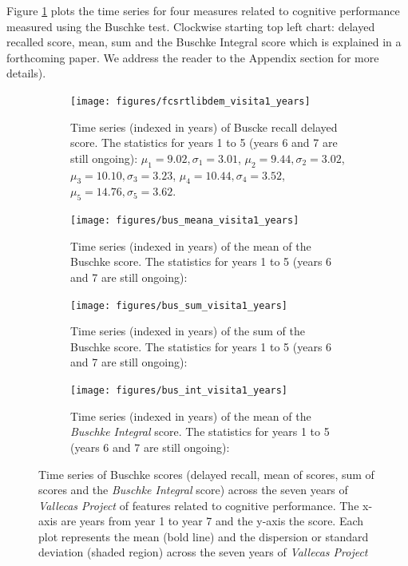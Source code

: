\documentclass[11pt]{article}
\theoremstyle{definition}
\theoremstyle{remark}
\begin{document}
Figure \ref{fig:busper4} plots the time series for four measures related to cognitive performance measured using the Buschke test. Clockwise starting top left chart: delayed recalled score, mean, sum and the Buschke Integral score which is explained in a forthcoming paper. We address the reader to the Appendix section for more details).

\begin{figure}[!htb]
    \centering
    \begin{subfigure}[t]{0.45\textwidth}
        \centering
        \texttt{[image: figures/fcsrtlibdem\_visita1\_years]}
        \caption{Time series (indexed in years) of Buscke recall delayed score. The statistics for years 1 to 5 (years 6 and 7 are still ongoing): $\mu_{1}=9.02, \sigma_{1}=3.01$, $\mu_{2}=9.44, \sigma_{2}=3.02$, $\mu_{3}=10.10, \sigma_{3}=3.23$, $\mu_{4}=10.44, \sigma_{4}=3.52$,$\mu_{5}=14.76,\sigma_{5}=3.62$.}
    \end{subfigure}
    \hfill
    \begin{subfigure}[t]{0.45\textwidth}
        \centering
        \texttt{[image: figures/bus\_meana\_visita1\_years]}
        \caption{Time series (indexed in years) of the mean of the Buschke score. The statistics for years 1 to 5 (years 6 and 7 are still ongoing): }
    \end{subfigure}%
    
     \begin{subfigure}[t]{0.45\textwidth}
        \centering
        \texttt{[image: figures/bus\_sum\_visita1\_years]}
        \caption{Time series (indexed in years) of the sum of the Buschke score. The statistics for years 1 to 5 (years 6 and 7 are still ongoing):}
    \end{subfigure}
    \hfill 
    \begin{subfigure}[t]{0.45\textwidth}
        \centering
        \texttt{[image: figures/bus\_int\_visita1\_years]}
        \caption{Time series (indexed in years) of the mean of the \emph{Buschke Integral} score. The statistics for years 1 to 5 (years 6 and 7 are still ongoing):}
    \end{subfigure}%
   
    \caption{Time series of Buschke scores (delayed recall, mean of scores, sum of scores and the \emph{Buschke Integral} score) across the seven years of \emph{Vallecas Project} of features related to cognitive performance. The x-axis are years from year 1 to year 7 and the y-axis the score. Each plot represents the mean (bold line) and the dispersion or standard deviation (shaded region) across the seven years of \emph{Vallecas Project}} 
    \label{fig:busper4}
\end{figure}
\end{document}
